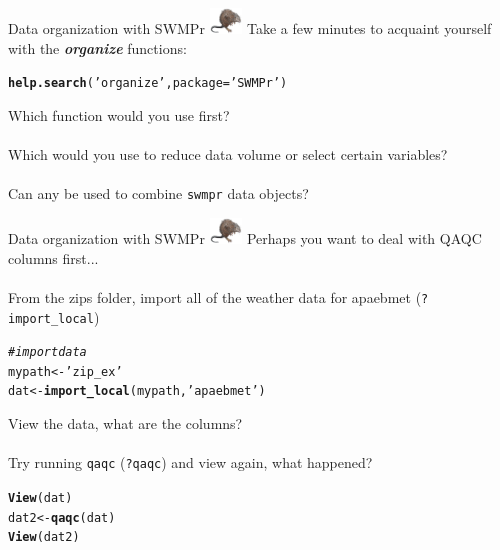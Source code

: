 \documentclass[xcolor=dvipsnames,serif]{beamer}\usepackage[]{graphicx}\usepackage[]{color}
\makeatletter
\newcommand{\hlstr}[1]{\textcolor[rgb]{0.192,0.494,0.8}{#1}}%
\newcommand{\hlcom}[1]{\textcolor[rgb]{0.678,0.584,0.686}{\textit{#1}}}%
\newcommand{\hlstd}[1]{\textcolor[rgb]{0.345,0.345,0.345}{#1}}%
\newcommand{\hlkwb}[1]{\textcolor[rgb]{0.69,0.353,0.396}{#1}}%
\newcommand{\hlkwc}[1]{\textcolor[rgb]{0.333,0.667,0.333}{#1}}%
\newcommand{\hlkwd}[1]{\textcolor[rgb]{0.737,0.353,0.396}{\textbf{#1}}}%
\newenvironment{kframe}{%
 \def\at@end@of@kframe{}%
 \ifinner\ifhmode%
  \def\at@end@of@kframe{\end{minipage}}%
  \begin{minipage}{\columnwidth}%
 \fi\fi%
 \def\FrameCommand##1{\hskip\@totalleftmargin \hskip-\fboxsep
 \colorbox{shadecolor}{##1}\hskip-\fboxsep
     \hskip-\linewidth \hskip-\@totalleftmargin \hskip\columnwidth}%
 \MakeFramed {\advance\hsize-\width
   \@totalleftmargin\z@ \linewidth\hsize
   \@setminipage}}%
 {\par\unskip\endMakeFramed%
 \at@end@of@kframe}
\newenvironment{knitrout}{}{} %
\newcommand{\Bigtxt}[1]{\textbf{\textit{#1}}}
\makeatother
\begin{document}
\begin{frame}[fragile]{Data organization with SWMPr \includegraphics[width = 0.065\textwidth]{imgs/swmprat.png}}
\onslide<+->
Take a few minutes to acquaint yourself with the \Bigtxt{organize} functions:
\begin{knitrout}\scriptsize
{}\color{fgcolor}\begin{kframe}
\begin{alltt}
\hlkwd{help.search}\hlstd{(}\hlstr{'organize'}\hlstd{,} \hlkwc{package} \hlstd{=} \hlstr{'SWMPr'}\hlstd{)}
\end{alltt}
\end{kframe}
\end{knitrout}
\onslide<+->
Which function would you use first? \\~\\
Which would you use to reduce data volume or select certain variables? \\~\\
Can any be used to combine \texttt{swmpr} data objects? 
\end{frame}

\begin{frame}[fragile]{Data organization with SWMPr \includegraphics[width = 0.065\textwidth]{imgs/swmprat.png}}
\onslide<+->
Perhaps you want to deal with QAQC columns first... \\~\\
From the zips folder, import all of the weather data for apaebmet (\texttt{?import\_local})
\onslide<+->
\begin{knitrout}\scriptsize
{}\color{fgcolor}\begin{kframe}
\begin{alltt}
\hlcom{# import data }
\hlstd{mypath} \hlkwb{<-} \hlstr{'zip_ex'}
\hlstd{dat} \hlkwb{<-} \hlkwd{import_local}\hlstd{(mypath,} \hlstr{'apaebmet'}\hlstd{)}
\end{alltt}
\end{kframe}
\end{knitrout}
\onslide<+->
View the data, what are the columns? \\~\\
Try running \texttt{qaqc} (\texttt{?qaqc}) and view again, what happened?
\onslide<+->
\begin{knitrout}\scriptsize
{}\color{fgcolor}\begin{kframe}
\begin{alltt}
\hlkwd{View}\hlstd{(dat)}
\hlstd{dat2} \hlkwb{<-} \hlkwd{qaqc}\hlstd{(dat)}
\hlkwd{View}\hlstd{(dat2)}
\end{alltt}
\end{kframe}
\end{knitrout}
\end{frame}
\end{document}
